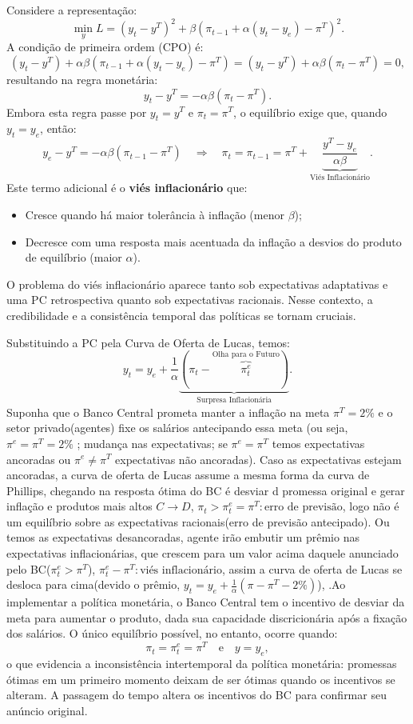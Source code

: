 \documentclass[a4paper,12pt]{article}[abntex2]
\begin{document}
Considere a representação:
\[
\min_{y} L = (y_t - y^T)^2 + \beta \left(\pi_{t-1} + \alpha (y_t - y_e) - \pi^T\right)^2.
\]
A condição de primeira ordem (CPO) é:
\[
(y_t - y^T) + \alpha\beta \left(\pi_{t-1} + \alpha (y_t - y_e) - \pi^T\right) = (y_t - y^T) + \alpha\beta (\pi_t - \pi^T) = 0,
\]
resultando na regra monetária:
\[
y_t - y^T = -\alpha\beta (\pi_t - \pi^T).
\]
Embora esta regra passe por $y_t = y^T$ e $\pi_t = \pi^T$, o equilíbrio exige que, quando $y_t = y_e$, então:
\[
y_e - y^T = -\alpha\beta (\pi_{t-1} - \pi^T) \quad \Rightarrow \quad \pi_t = \pi_{t-1} = \pi^T + \underbrace{\frac{y^T - y_e}{\alpha\beta}}_\text{Viés Inflacionário}.
\]
Este termo adicional é o \textbf{viés inflacionário} que:
\begin{itemize}
    \item Cresce quando há maior tolerância à inflação (menor $\beta$);
    \item Decresce com uma resposta mais acentuada da inflação a desvios do produto de equilíbrio (maior $\alpha$).
\end{itemize}

O problema do viés inflacionário aparece tanto sob expectativas adaptativas e uma PC retrospectiva quanto sob expectativas racionais. Nesse contexto, a credibilidade e a consistência temporal das políticas se tornam cruciais.

Substituindo a PC pela Curva de Oferta de Lucas, temos:
\[
y_t = y_e + \frac{1}{\alpha}\underbrace{(\pi_t - \overbrace{\pi_t^e}^\text{Olha para o Futuro}) }_\text{Surpresa Inflacionária}.
\]
Suponha que o Banco Central prometa manter a inflação na meta $\pi^T = 2\%$ e o setor privado(agentes) fixe os salários antecipando essa meta (ou seja, $\pi^e = \pi^T = 2\%$ ; mudança nas expectativas; se \(\pi^e = \pi^T\) temos expectativas ancoradas ou \(\pi^e \neq \pi^T\) expectativas não ancoradas). Caso as expectativas estejam ancoradas, a curva de oferta de Lucas assume a mesma forma da curva de Phillips, chegando na resposta ótima do BC é desviar d promessa original e gerar inflação e produtos mais altos \(C\rightarrow D\), \(\pi_t>\pi_t^e=\pi^T:\text{erro de previsão}\), logo não é um equilíbrio sobre as expectativas racionais(erro de previsão antecipado). Ou temos as expectativas desancoradas, agente irão embutir um prêmio nas expectativas inflacionárias, que crescem para um valor acima daquele anunciado pelo BC(\(\pi_t^e>\pi^T\)), \(\pi_t^e-\pi^T:\text{viés inflacionário}\), assim a curva de oferta de Lucas se desloca para cima(devido o prêmio, \(y_t=y_e+\frac{1}{\alpha}(\pi-\pi^T-2\%)\)), .Ao implementar a política monetária, o Banco Central tem o incentivo de desviar da meta para aumentar o produto, dada sua capacidade discricionária após a fixação dos salários. O único equilíbrio possível, no entanto, ocorre quando:
\[
\pi_t = \pi_t^e = \pi^T \quad \text{e} \quad y = y_e,
\]
o que evidencia a inconsistência intertemporal da política monetária: promessas ótimas em um primeiro momento deixam de ser ótimas quando os incentivos se alteram. A passagem do tempo altera os incentivos do BC para confirmar seu anúncio original.
\end{document}
